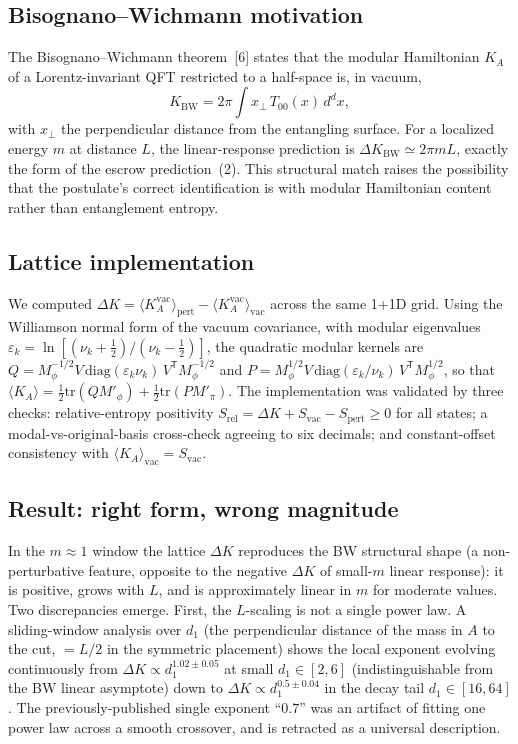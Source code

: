 \documentclass[11pt]{article}
\newcommand{\Svac}{S_{\mathrm{vac}}}
\begin{document}
\subsection{Bisognano--Wichmann motivation}
The Bisognano--Wichmann theorem~[6] states that the modular Hamiltonian $K_{A}$ of a
Lorentz-invariant QFT restricted to a half-space is, in vacuum,
\begin{equation}
  K_{\mathrm{BW}} = 2\pi\int x_{\perp}\,T_{00}(x)\,d^{d}x,
\end{equation}
with $x_{\perp}$ the perpendicular distance from the entangling surface. For a localized energy $m$ at
distance $L$, the linear-response prediction is $\Delta K_{\mathrm{BW}} \simeq 2\pi m L$, exactly the form
of the escrow prediction~(2). This structural match raises the possibility that the postulate's correct
identification is with modular Hamiltonian content rather than entanglement entropy.

\subsection{Lattice implementation}
We computed
$\Delta K = \langle K_{A}^{\mathrm{vac}}\rangle_{\mathrm{pert}} -
\langle K_{A}^{\mathrm{vac}}\rangle_{\mathrm{vac}}$ across the same 1+1D grid. Using the Williamson
normal form of the vacuum covariance, with modular eigenvalues
$\varepsilon_{k} = \ln[(\nu_{k}+\tfrac{1}{2})/(\nu_{k}-\tfrac{1}{2})]$, the quadratic modular kernels are
$Q = M_{\phi}^{-1/2} V\,\mathrm{diag}(\varepsilon_{k}\nu_{k})\,V^{\mathsf{T}} M_{\phi}^{-1/2}$ and
$P = M_{\phi}^{1/2} V\,\mathrm{diag}(\varepsilon_{k}/\nu_{k})\,V^{\mathsf{T}} M_{\phi}^{1/2}$, so that
$\langle K_{A}\rangle = \tfrac{1}{2}\mathrm{tr}(Q M'_{\phi}) + \tfrac{1}{2}\mathrm{tr}(P M'_{\pi})$. The
implementation was validated by three checks: relative-entropy positivity
$S_{\mathrm{rel}} = \Delta K + \Svac - S_{\mathrm{pert}} \ge 0$ for all states; a modal-vs-original-basis
cross-check agreeing to six decimals; and constant-offset consistency with $\langle K_{A}\rangle_{\mathrm{vac}} = \Svac$.

\subsection{Result: right form, wrong magnitude}
In the $m\approx 1$ window the lattice $\Delta K$ reproduces the BW structural shape (a non-perturbative feature, opposite to the negative $\Delta K$ of small-$m$ linear response): it is positive, grows with $L$, and is
approximately linear in $m$ for moderate values. Two discrepancies emerge. First, the $L$-scaling is
not a single power law. A sliding-window analysis over $d_{1}$ (the perpendicular distance of the mass
in $A$ to the cut, $=L/2$ in the symmetric placement) shows the local exponent evolving continuously
from $\Delta K \propto d_{1}^{1.02\pm 0.05}$ at small $d_{1}\in[2,6]$ (indistinguishable from the BW
linear asymptote) down to $\Delta K \propto d_{1}^{0.5\pm 0.04}$ in the decay tail $d_{1}\in[16,64]$. The
previously-published single exponent ``$0.7$'' was an artifact of fitting one power law across a smooth
crossover, and is retracted as a universal description.
\end{document}
